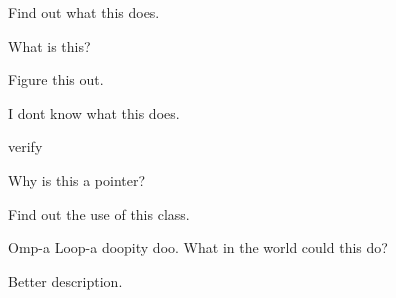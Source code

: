 \begin{DoxyRefList}
%
Find out what this does.  
\item[Class \mbox{\hyperlink{structeinsums_1_1TensorView}{einsums\+::Tensor\+View$<$ T, Rank $>$}} ]\label{todo__todo000024}%
%
What is this?  
\item[Member \mbox{\hyperlink{structeinsums_1_1TensorView_a5b52626208311c86c5700789f20f13b0}{einsums\+::Tensor\+View$<$ T, Rank $>$\+::data\+\_\+array}} (const std\+::array$<$ size\+\_\+t, Rank $>$ \&index\+\_\+list) const -\/$>$ T $\ast$]\label{todo__todo000030}%
%
Figure this out.  
\item[Member \mbox{\hyperlink{structeinsums_1_1TensorView_aa4a1a78725e5f33f057bdf1276335406}{einsums\+::Tensor\+View$<$ T, Rank $>$\+::full\+\_\+view\+\_\+of\+\_\+underlying}} () const noexcept -\/$>$ bool]\label{todo__todo000031}%
%
I don\textquotesingle{}t know what this does.  
\item[Member \mbox{\hyperlink{structeinsums_1_1TensorView_ac8b62e9e9d5808ca70799c0198ee6a5d}{einsums\+::Tensor\+View$<$ T, Rank $>$\+::operator=}} (const AType$<$ T, Rank $>$ \&\&other) -\/$>$ typename std\+::enable\+\_\+if\+\_\+t$<$ is\+\_\+incore\+\_\+rank\+\_\+tensor\+\_\+v$<$ AType$<$ T, Rank $>$, Rank, T $>$, \mbox{\hyperlink{structeinsums_1_1TensorView}{Tensor\+View}} \& $>$]\label{todo__todo000029}%
%
verify 
\item[Member \mbox{\hyperlink{structeinsums_1_1TensorView_a662a20c9ab08756ed276b16ddcf78bdc}{einsums\+::Tensor\+View$<$ T, Rank $>$\+::operator=}} (const T $\ast$other) -\/$>$ \mbox{\hyperlink{structeinsums_1_1TensorView}{Tensor\+View}} \&]\label{todo__todo000028}%
%
Why is this a pointer? 
\item[Class \mbox{\hyperlink{classOffset}{Offset}} ]\label{todo__todo000003}%
%
Find out the use of this class.  
\item[Member \mbox{\hyperlink{ElementOperations_8hpp_af5439ec02d3ba3ef1f7657b499012567}{omp\+\_\+loop}} (vector \&data, Functor functor)]\label{todo__todo000032}%
%
Omp-\/a Loop-\/a doopity doo. What in the world could this do? 
\item[Class \mbox{\hyperlink{structprint_1_1Indent}{print\+::Indent}} ]\label{todo__todo000016}%
%
Better description.  
\item[Member \mbox{\hyperlink{namespaceprint_a06b242948a7b85000ab9fe1b2d0f7de9}{print\+::stacktrace}} ()]\label{todo__todo000017}%

\end{DoxyRefList}
